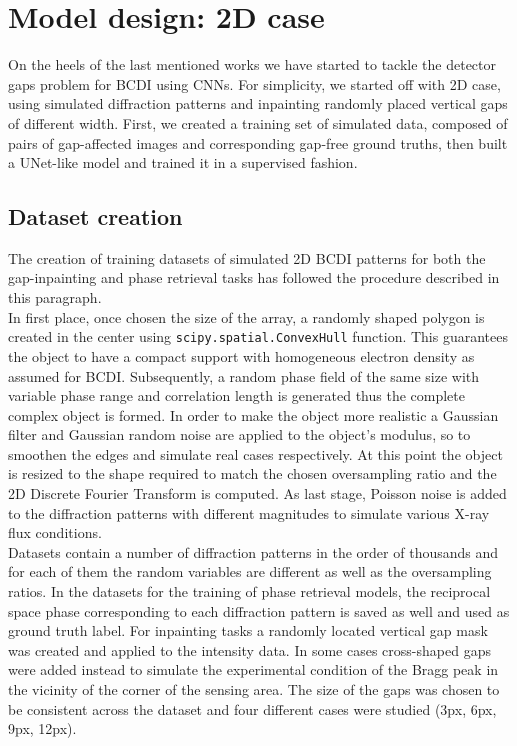 \section{Model design: 2D case}\label{sec:model}

On the heels of the last mentioned works we have started to tackle the detector gaps problem for BCDI using CNNs. For simplicity, we started off with 2D
case, using simulated diffraction patterns and inpainting randomly placed vertical gaps of different width. First, we created a training set of 
simulated data, composed of pairs of gap-affected images and corresponding gap-free ground truths, then built a UNet-like model and trained it 
in a supervised fashion.

\subsection{Dataset creation}

The creation of training datasets of simulated 2D BCDI patterns for both the gap-inpainting and phase retrieval tasks has followed the procedure
described in this paragraph.\\
In first place, once chosen the size of the array, a randomly shaped polygon is created in the center using \texttt{scipy.spatial.ConvexHull} 
function. This guarantees the object to have a compact support with homogeneous electron density as assumed for BCDI. Subsequently, 
a random phase field of the same size with variable phase range and correlation length is generated thus the complete complex object is formed.
In order to make the object more realistic a Gaussian filter and Gaussian random noise are applied to the object's modulus, so to smoothen the edges 
and simulate real cases respectively. At this point the object is resized to the shape required to match the chosen oversampling ratio and the 2D
Discrete Fourier Transform is computed. As last stage, Poisson noise is added to the diffraction patterns with different magnitudes to simulate 
various X-ray flux conditions. \\
Datasets contain a number of diffraction patterns in the order of thousands and for each of them the random variables are different as well as the 
oversampling ratios. In the datasets for the training of phase retrieval models, the reciprocal space phase corresponding to each diffraction pattern
is saved as well and used as ground truth label. 
For inpainting tasks a randomly located vertical gap mask was created and applied to the intensity data. In some cases cross-shaped gaps were 
added instead to simulate the experimental condition of the Bragg peak in the vicinity of the corner of the sensing area. 
The size of the gaps was chosen to be consistent across the dataset and four different cases were studied (3px, 6px, 9px, 12px).

